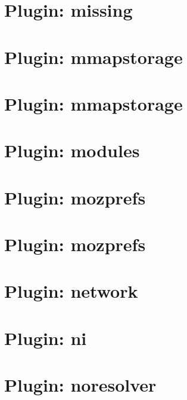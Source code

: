 \let\mypdfximage\pdfximage\def\pdfximage{\immediate\mypdfximage}\documentclass[twoside]{book}
\newcommand{\+}{\discretionary{\mbox{\scriptsize$\hookleftarrow$}}{}{}}
\begin{document}
\chapter{Plugin\+: missing}
\label{md_src_plugins_missing_README}

\chapter{Plugin\+: mmapstorage}
\label{md_src_plugins_mmapstorage_README}

\chapter{Plugin\+: mmapstorage}
\label{md_src_plugins_mmapstorage_shelltests}

\chapter{Plugin\+: modules}
\label{md_src_plugins_modules_README}

\chapter{Plugin\+: mozprefs}
\label{md_src_plugins_mozprefs_autoconfig_README}

\chapter{Plugin\+: mozprefs}
\label{md_src_plugins_mozprefs_README}

\chapter{Plugin\+: network}
\label{md_src_plugins_network_README}

\chapter{Plugin\+: ni}
\label{md_src_plugins_ni_README}

\chapter{Plugin\+: noresolver}
\label{md_src_plugins_noresolver_README}

\end{document}
